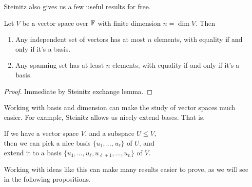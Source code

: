 \documentclass[a4paper]{scrartcl}
\begin{document}
Steinitz also gives us a few useful results for free.

\begin{corollary}
    Let $V$ be a vector space over $\mathbb{F}$ with finite dimension $n = \dim V$. Then
    \begin{enumerate}[label=(\roman*)]
        \item Any independent set of vectors has at most $n$ elements, with equality if and only if it's a basis.
        \item Any spanning set has at least $n$ elements, with equality if and only if it's a basis.
    \end{enumerate} 
\end{corollary}
\begin{proof}
    Immediate by Steinitz exchange lemma.
\end{proof}

Working with basis and dimension can make the study of vector spaces much easier. For example, Steinitz allows us nicely extend bases. That is,
\begin{center}
	\color{blue}
    If we have a vector space $V$, and a subspace $U \leq V$, \\then we can pick a nice basis $\{u_1, \dots, u_\ell\}$ of $U$, and \\extend it to a basis $\{u_1, \dots, u_{\ell}, u_{\ell + 1}, \dots, u_n\}$ of $V$.
\end{center}Working with ideas like this can make many results easier to prove, as we will see in the following propositions.
\end{document}
